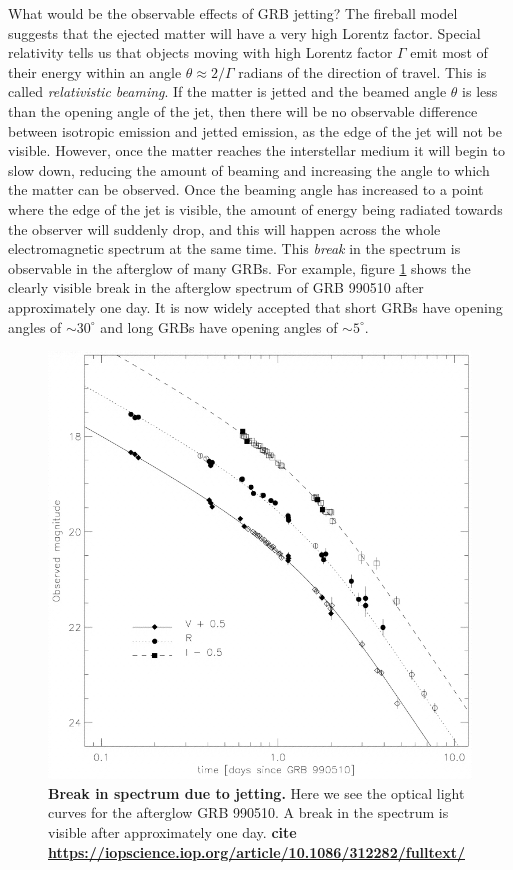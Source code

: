 \documentclass[11pt]{cuthesis}
\begin{document}
What would be the observable effects of GRB jetting? The fireball model suggests that the ejected matter will have a very high Lorentz factor. Special relativity tells us that objects moving with high Lorentz factor $\Gamma$ emit most of their energy within an angle $\theta\approx 2/\Gamma$ radians of the direction of travel. This is called \textit{relativistic beaming}. If the matter is jetted and the beamed angle $\theta$ is less than the opening angle of the jet, then there will be no observable difference between isotropic emission and jetted emission, as the edge of the jet will not be visible. However, once the matter reaches the interstellar medium it will begin to slow down, reducing the amount of beaming and increasing the angle to which the matter can be observed. Once the beaming angle has increased to a point where the edge of the jet is visible, the amount of energy being radiated towards the observer will suddenly drop, and this will happen across the whole electromagnetic spectrum at the same time. This \textit{break} in the spectrum is observable in the afterglow of many GRBs. For example, figure \ref{fig:jetbreak} shows the clearly visible break in the afterglow spectrum of GRB 990510 after approximately one day. It is now widely accepted that short GRBs have opening angles of $\sim 30^\circ$ and long GRBs have opening angles of $\sim 5^\circ$.

\begin{figure} %
\begin{center}
\includegraphics[width=0.8\linewidth]{jetbreak.png}
\end{center}
\caption{\textbf{Break in spectrum due to jetting.} Here we see the optical light curves for the afterglow GRB 990510. A break in the spectrum is visible after approximately one day. \textbf{cite \url{https://iopscience.iop.org/article/10.1086/312282/fulltext/} }}
\label{fig:jetbreak}
\end{figure}
\end{document}
